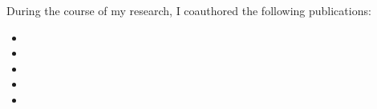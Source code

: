 \tableofcontents





During the course of my research, I coauthored the following publications:

\nobibliography*
\begin{NoHyper}
\begin{itemize}
\item {}
\item {}
\item {}
\item {}
\item {}
\end{itemize}
\end{NoHyper}

\cleardoublepage
{}

